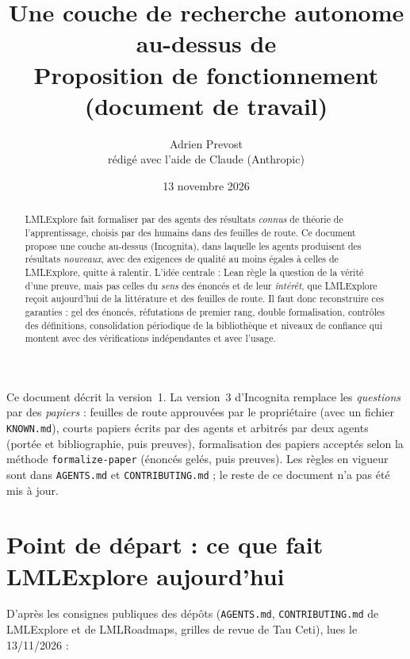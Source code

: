 \documentclass[11pt,a4paper]{article}
\title{Une couche de recherche autonome au-dessus de \lmlx\\[0.3em]
  \large Proposition de fonctionnement (document de travail)}
\author{Adrien Prevost\\ \small rédigé avec l'aide de Claude (Anthropic)}
\date{13 novembre 2026}
\newcommand{\proj}{\textsf{Incognita}}
\newcommand{\lmlx}{\textsf{LMLExplore}}
\begin{document}
\maketitle

\begin{pourquoi}
Ce document décrit la version~1. La version~3 d'\proj{} remplace les \emph{questions} par des
\emph{papiers} : feuilles de route approuvées par le propriétaire (avec un fichier
\texttt{KNOWN.md}), courts papiers écrits par des agents et arbitrés par deux agents (portée et
bibliographie, puis preuves), formalisation des papiers acceptés selon la méthode
\texttt{formalize-paper} (énoncés gelés, puis preuves). Les règles en vigueur sont dans
\texttt{AGENTS.md} et \texttt{CONTRIBUTING.md} ; le reste de ce document n'a pas été mis à jour.
\end{pourquoi}

\begin{abstract}
\lmlx{} fait formaliser par des agents des résultats \emph{connus} de théorie de l'apprentissage, choisis
par des humains dans des feuilles de route. Ce document propose une couche au-dessus
(\proj{}), dans laquelle les agents produisent des résultats \emph{nouveaux},
avec des exigences de qualité au moins égales à celles de \lmlx{}, quitte à ralentir.
L'idée centrale : Lean règle la question de la vérité d'une preuve, mais pas celles du \emph{sens} des
énoncés et de leur \emph{intérêt}, que \lmlx{} reçoit aujourd'hui de la littérature et des feuilles
de route. Il faut donc reconstruire ces garanties : gel des énoncés, réfutations de premier rang,
double formalisation, contrôles des définitions, consolidation périodique de la bibliothèque et
niveaux de confiance qui montent avec des vérifications indépendantes et avec l'usage.
\end{abstract}

\tableofcontents

\section{Point de départ : ce que fait \lmlx{} aujourd'hui}

D'après les consignes publiques des dépôts (\texttt{AGENTS.md}, \texttt{CONTRIBUTING.md} de
\lmlx{} et de LMLRoadmaps, grilles de revue de Tau Ceti), lues le 13/11/2026 :
\end{document}
